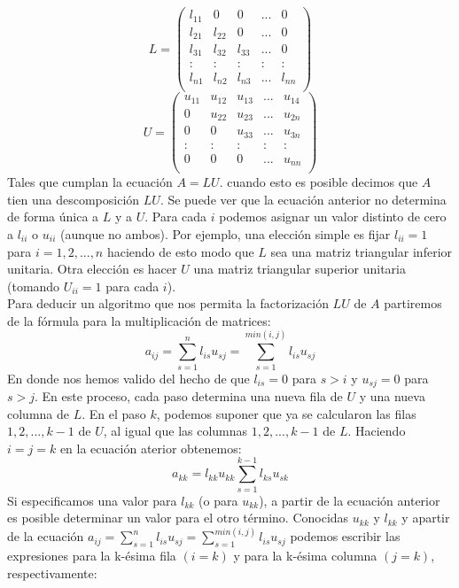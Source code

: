 \[ L =
\left(
\begin{array}{lcrcr}
l_{11} & 0 & 0 & ... & 0 \\
l_{21} & l_{22} & 0 & ... & 0 \\
l_{31} & l_{32} & l_{33} & ... &0 \\
: & : & : &  : & :\\
l_{n1} & l_{n2} & l_{n3} & ... &l_{nn} \\
\end{array}
\right)
\]
\[ U =
\left(
\begin{array}{lcrcr}
u_{11} & u_{12} & u_{13} & ... & u_{14} \\
0 & u_{22} & u_{23} & ... & u_{2n} \\
0 & 0 & u_{33} & ... &u_{3n} \\
: & : & : &  : & :\\
0 & 0 & 0 & ... &u_{nn} \\
\end{array}
\right)
\]
Tales que cumplan la ecuación $A=LU$. cuando esto es posible decimos que $A$ tien una descomposición $LU$. Se puede ver que la ecuación anterior no determina de forma única a $L$ y a $U$. Para cada $i$ podemos asignar un valor distinto de cero a $l_{ii}$ o $u_{ii}$ (aunque no ambos). Por ejemplo, una elección simple es fijar $l_{ii} = 1$ para $i=1,2,...,n$ haciendo de esto modo que $L$ sea una matriz triangular inferior unitaria. Otra elección es hacer $U$ una matriz triangular superior unitaria (tomando $U_{ii} = 1$ para cada $i$).\\
Para deducir un algoritmo que nos permita la factorización $LU$ de $A$ partiremos de la fórmula para la multiplicación de matrices:\\
\[a_{ij} = \sum_{s=1}^{n} l_{is}u_{sj} = \sum_{s=1}^{min(i,j)} l_{is}u_{sj}\]
En donde nos hemos valido del hecho de que $l_{is} = 0$ para $s>i$ y $u_{sj}=0$ para $s>j$.
En este proceso, cada paso determina una nueva fila de $U$ y una nueva columna de $L$. En el paso $k$, podemos suponer que ya se calcularon las filas $1,2,...,k-1$ de $U$, al igual que las columnas $1,2,...,k-1$ de $L$. Haciendo $i=j=k$ en la ecuación aterior obtenemos:
\[a_{kk} = l_{kk}u_{kk} \sum_{s=1}^{k-1}l_{ks}  u_{sk}\]
Si especificamos una valor para $l_{kk}$ (o para $u_{kk}$), a partir de la ecuación anterior es posible determinar un valor para el otro término. Conocidas $u_{kk}$ y $l_{kk}$ y apartir de la ecuación $a_{ij} = \sum_{s=1}^{n} l_{is}u_{sj} = \sum_{s=1}^{min(i,j)} l_{is}u_{sj}$ podemos escribir las expresiones para la k-ésima fila $(i=k)$ y para la k-ésima columna $(j=k)$, respectivamente:
